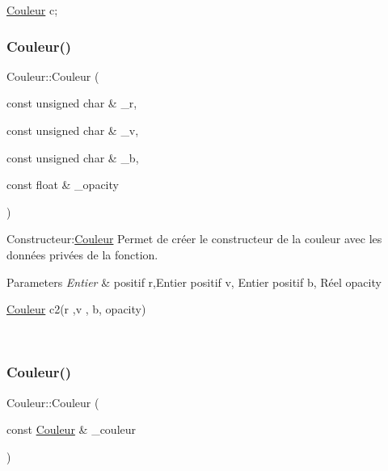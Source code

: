 \begin{DoxyCode}
\hyperlink{classCouleur}{Couleur} c;
\end{DoxyCode}
 \mbox{\label{classCouleur_ac51d4f087f4ff01b84628557dc7a33f4}} 
\subsubsection{\texorpdfstring{Couleur()}{Couleur()}\hspace{0.1cm}{\footnotesize\ttfamily [2/3]}}
{\footnotesize\ttfamily Couleur\+::\+Couleur (\begin{DoxyParamCaption}\item[{const unsigned char \&}]{\+\_\+r,  }\item[{const unsigned char \&}]{\+\_\+v,  }\item[{const unsigned char \&}]{\+\_\+b,  }\item[{const float \&}]{\+\_\+opacity }\end{DoxyParamCaption})}



Constructeur\+:\hyperlink{classCouleur}{Couleur} Permet de créer le constructeur de la couleur avec les données privées de la fonction. 


\begin{DoxyParams}{Parameters}
{\em Entier} & positif r,Entier positif v, Entier positif b, Réel opacity 
\begin{DoxyCode}
\hyperlink{classCouleur}{Couleur} c2(r ,v , b, opacity)
\end{DoxyCode}
 \\
\hline
\end{DoxyParams}
\mbox{\label{classCouleur_a393a7c4193f593f083d7a25dba062cc5}} 
\subsubsection{\texorpdfstring{Couleur()}{Couleur()}\hspace{0.1cm}{\footnotesize\ttfamily [3/3]}}
{\footnotesize\ttfamily Couleur\+::\+Couleur (\begin{DoxyParamCaption}\item[{const \hyperlink{classCouleur}{Couleur} \&}]{\+\_\+couleur }\end{DoxyParamCaption})}



